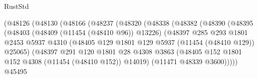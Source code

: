 \begin{lexlean}{RustStd}
\begin{coremodule}
                                    (@48126
                                      (@48130
                                        (@48166
                                          (@48237
                                            (@48320
                                              (@48338
                                                (@48382
                                                  (@48390
                                                    (@48395
                                                      (@48403
                                                        (@48409 (@11454 (@48410 @96)) @13226)
                                                        (@48397
                                                          @285
                                                          @293
                                                          @1801
                                                          @2453
                                                          @5937
                                                          @4310
                                                          (@48405
                                                            @129
                                                            @1801
                                                            @129
                                                            @5937
                                                            (@11454 (@48410 @129))
                                                            @25065)
                                                          (@48397
                                                            @291
                                                            @120
                                                            @1801
                                                            @28
                                                            @4308
                                                            @3863
                                                            (@48405
                                                              @152
                                                              @1801
                                                              @152
                                                              @4308
                                                              (@11454 (@48410 @152))
                                                              @14019)
                                                            (@11471 @48339 @3600)))))
                                                    @45495

\end{coremodule}
\end{lexlean}
